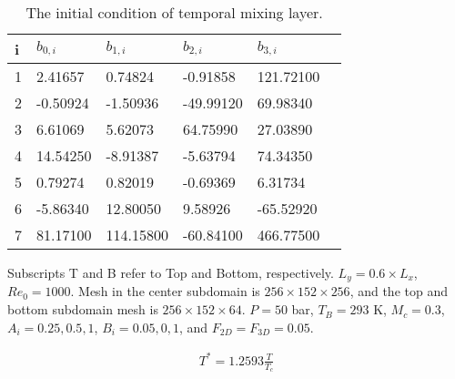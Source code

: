 {\begin{table}
    \caption{The initial condition of temporal mixing layer.}\label{TML_init_table1}
    \begin{threeparttable} 
\begin{tabular*}{0.8\textwidth}{@{} l|lllll@{}}
    \toprule
    i     & $b_{0,i}$   & $b_{1,i}$  & $b_{2,i}$   & $b_{3,i}$ \\
    \midrule
    1     & 2.41657          & 0.74824           & -0.91858        & 121.72100  \\
    2     & -0.50924         & -1.50936          & -49.99120       & 69.98340   \\
    3     & 6.61069          & 5.62073           & 64.75990        & 27.03890  \\
    4     & 14.54250         & -8.91387          & -5.63794        & 74.34350    \\
    5     & 0.79274          & 0.82019           & -0.69369        & 6.31734    \\
    6     & -5.86340         & 12.80050          & 9.58926         & -65.52920   \\
    7     & 81.17100         & 114.15800         & -60.84100       & 466.77500   \\
 \bottomrule
\end{tabular*}
\begin{tablenotes}
    \footnotesize    
    \item Subscripts T and B refer to Top and Bottom, respectively. $L_y = 0.6\times L_x$,  $Re_0=1000$. Mesh in the center subdomain is $256\times 152 \times 256$, and the top and bottom subdomain mesh is $256\times 152\times 64$. $P = 50$ bar, $T_B=293$ K, $M_c = 0.3$, $A_i = 0.25, 0.5, 1$, $B_i = 0.05, 0, 1$, and $F_{2D}= F_{3D} = 0.05$.\\
  \end{tablenotes}
\end{threeparttable}
\end{table}

\begin{align}
T^* = 1.2593 \frac{T}{T_c}
\end{align}


}


